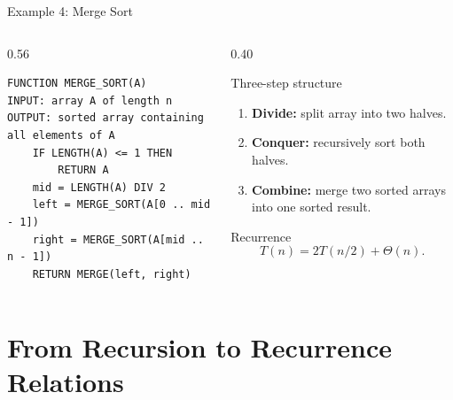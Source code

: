 \documentclass[aspectratio=169]{beamer}
\begin{document}
\begin{frame}[fragile]{Example 4: Merge Sort}
  \begin{columns}[T]
    \begin{column}{0.56\textwidth}
\begin{lstlisting}[style=pseudonumbered,basicstyle=\ttfamily\scriptsize]
FUNCTION MERGE_SORT(A)
INPUT: array A of length n
OUTPUT: sorted array containing all elements of A
    IF LENGTH(A) <= 1 THEN
        RETURN A
    mid = LENGTH(A) DIV 2
    left = MERGE_SORT(A[0 .. mid - 1])
    right = MERGE_SORT(A[mid .. n - 1])
    RETURN MERGE(left, right)
\end{lstlisting}
    \end{column}
    \begin{column}{0.40\textwidth}
      \begin{block}{Three-step structure}
        \small
        \begin{enumerate}
          \item \textbf{Divide:} split array into two halves.
          \item \textbf{Conquer:} recursively sort both halves.
          \item \textbf{Combine:} merge two sorted arrays into one sorted result.
        \end{enumerate}
      \end{block}
      \begin{exampleblock}{Recurrence}
        \small
        \[
          T(n)=2T(n/2)+\Theta(n).
        \]
      \end{exampleblock}
    \end{column}
  \end{columns}
\end{frame}

\section{From Recursion to Recurrence Relations}
\end{document}
